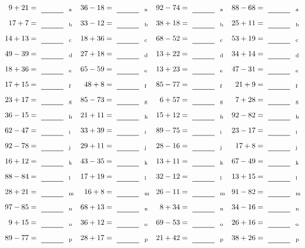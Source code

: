\documentclass
[
  draft    = true,
  fontsize = 11pt,
  parskip  = half-
]
{scrartcl}
\begin{document}
\clearpage
\begin{align*}
    \pline{9+21}&=\rline{a}
  & \pline{36-18}&=\rline{a}
  & \pline{92-74}&=\rline{a}
  & \pline{88-68}&=\rline{a} \\[1ex]
    \pline{17+7}&=\rline{b}
  & \pline{33-12}&=\rline{b}
  & \pline{38+18}&=\rline{b}
  & \pline{25+11}&=\rline{b} \\[1ex]
    \pline{14+13}&=\rline{c}
  & \pline{18+36}&=\rline{c}
  & \pline{68-52}&=\rline{c}
  & \pline{53+19}&=\rline{c} \\[1ex]
    \pline{49-39}&=\rline{d}
  & \pline{27+18}&=\rline{d}
  & \pline{13+22}&=\rline{d}
  & \pline{34+14}&=\rline{d} \\[1ex]
    \pline{18+36}&=\rline{e}
  & \pline{65-59}&=\rline{e}
  & \pline{13+23}&=\rline{e}
  & \pline{47-31}&=\rline{e} \\[1ex]
    \pline{17+15}&=\rline{f}
  & \pline{48+8}&=\rline{f}
  & \pline{85-77}&=\rline{f}
  & \pline{21+9}&=\rline{f} \\[1ex]
    \pline{23+17}&=\rline{g}
  & \pline{85-73}&=\rline{g}
  & \pline{6+57}&=\rline{g}
  & \pline{7+28}&=\rline{g} \\[1ex]
    \pline{36-15}&=\rline{h}
  & \pline{21+11}&=\rline{h}
  & \pline{15+12}&=\rline{h}
  & \pline{92-82}&=\rline{h} \\[1ex]
    \pline{62-47}&=\rline{i}
  & \pline{33+39}&=\rline{i}
  & \pline{89-75}&=\rline{i}
  & \pline{23-17}&=\rline{i} \\[1ex]
    \pline{92-78}&=\rline{j}
  & \pline{29+11}&=\rline{j}
  & \pline{28-16}&=\rline{j}
  & \pline{17+8}&=\rline{j} \\[1ex]
    \pline{16+12}&=\rline{k}
  & \pline{43-35}&=\rline{k}
  & \pline{13+11}&=\rline{k}
  & \pline{67-49}&=\rline{k} \\[1ex]
    \pline{88-84}&=\rline{l}
  & \pline{17+19}&=\rline{l}
  & \pline{32-12}&=\rline{l}
  & \pline{13+15}&=\rline{l} \\[1ex]
    \pline{28+21}&=\rline{m}
  & \pline{16+8}&=\rline{m}
  & \pline{26-11}&=\rline{m}
  & \pline{91-82}&=\rline{m} \\[1ex]
    \pline{97-85}&=\rline{n}
  & \pline{68+13}&=\rline{n}
  & \pline{8+34}&=\rline{n}
  & \pline{34-16}&=\rline{n} \\[1ex]
    \pline{9+15}&=\rline{o}
  & \pline{36+12}&=\rline{o}
  & \pline{69-53}&=\rline{o}
  & \pline{26+16}&=\rline{o} \\[1ex]
    \pline{89-77}&=\rline{p}
  & \pline{28+17}&=\rline{p}
  & \pline{21+42}&=\rline{p}
  & \pline{38+26}&=\rline{p}
\end{align*}
\end{document}
